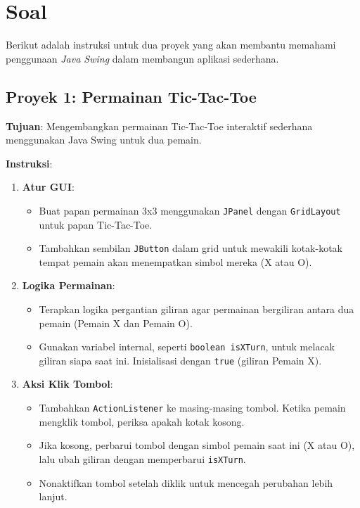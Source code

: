\section{Soal}

Berikut adalah instruksi untuk dua proyek yang akan membantu memahami penggunaan \textit{Java Swing} dalam membangun aplikasi sederhana.

\subsection*{Proyek 1: Permainan Tic-Tac-Toe}
\textbf{Tujuan}: Mengembangkan permainan Tic-Tac-Toe interaktif sederhana menggunakan Java Swing untuk dua pemain.

\textbf{Instruksi}:
\begin{enumerate}
	\item \textbf{Atur GUI}:
	\begin{itemize}
		\item Buat papan permainan 3x3 menggunakan \texttt{JPanel} dengan \texttt{GridLayout} untuk papan Tic-Tac-Toe.
		\item Tambahkan sembilan \texttt{JButton} dalam grid untuk mewakili kotak-kotak tempat pemain akan menempatkan simbol mereka (X atau O).
	\end{itemize}
	
	\item \textbf{Logika Permainan}:
	\begin{itemize}
		\item Terapkan logika pergantian giliran agar permainan bergiliran antara dua pemain (Pemain X dan Pemain O).
		\item Gunakan variabel internal, seperti \texttt{boolean isXTurn}, untuk melacak giliran siapa saat ini. Inisialisasi dengan \texttt{true} (giliran Pemain X).
	\end{itemize}
	
	\item \textbf{Aksi Klik Tombol}:
	\begin{itemize}
		\item Tambahkan \texttt{ActionListener} ke masing-masing tombol. Ketika pemain mengklik tombol, periksa apakah kotak kosong.
		\item Jika kosong, perbarui tombol dengan simbol pemain saat ini (X atau O), lalu ubah giliran dengan memperbarui \texttt{isXTurn}.
		\item Nonaktifkan tombol setelah diklik untuk mencegah perubahan lebih lanjut.
	\end{itemize}
	

\end{enumerate}
